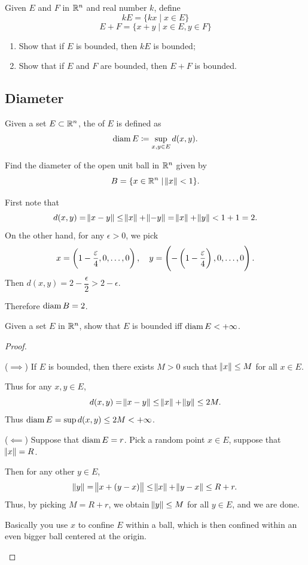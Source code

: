 \begin{exercise}{}{}
Given $E$ and $F$ in $\mathbb R^n$ and real number $k$, define
\[ kE=\{kx \mid x\in E\} \]
\[ E+F=\{x+y \mid x\in E,y\in F\} \]
\begin{enumerate}[label=(\alph*)]
\item Show that if $E$ is bounded, then $kE$ is bounded;
\item Show that if $E$ and $F$ are bounded, then $E+F$ is bounded.
\end{enumerate}
\end{exercise}

\subsection{Diameter}
\begin{definition}
Given a set $E\subset\mathbb R^n$, the  of $E$ is defined as
\[ \operatorname{diam} E\coloneqq\sup_{x,y\in E}d(x,y). \]
\end{definition}

\begin{exercise}{}{}
Find the diameter of the open unit ball in $\mathbb R^n$ given by
\[ B=\{x\in\mathbb R^n \mid \norm{x}<1\}. \]
\end{exercise}
\begin{solution}
First note that
\[ d(x,y)=\norm{x-y}\le\norm{x}+\norm{-y}=\norm{x}+\norm{y}<1+1=2. \]
On the other hand, for any $\epsilon>0$, we pick
\[ x=\left(1-\frac{\varepsilon}{4},0,\dots,0\right), \quad y=\left(-\left(1-\frac{\varepsilon}{4}\right),0,\dots,0\right). \]
Then $d(x,y)=2-\dfrac{\epsilon}{2}>2-\epsilon$.

Therefore $\operatorname{diam} B = 2$.
\end{solution}

\begin{exercise}{}{}
Given a set $E$ in $\mathbb R^n$, show that $E$ is bounded iff $\operatorname{diam} E<+\infty$.
\end{exercise}
\begin{proof} \

($\implies$) If $E$ is bounded, then there exists $M>0$ such that $\norm{x}\le M$ for all $x \in E$.

Thus for any $x,y \in E$,
\[ d(x,y)=\norm{x-y}\le\norm{x}+\norm{y}\le2M. \]
Thus $\operatorname{diam} E = \sup d(x,y) \le 2M<+\infty$.

($\impliedby$) Suppose that $\operatorname{diam} E=r$. Pick a random point $x \in E$, suppose that $\norm{x}=R$.

Then for any other $y \in E$,
\[ \norm{y}=\norm{x+(y-x)}\le\norm{x}+\norm{y-x}\le R+r. \]
Thus, by picking $M=R+r$, we obtain $\norm{y}\le M$ for all $y \in E$, and we are done.

\begin{remark}
Basically you use $x$ to confine $E$ within a ball, which is then confined within an even bigger ball centered at the origin.
\end{remark}
\end{proof}

